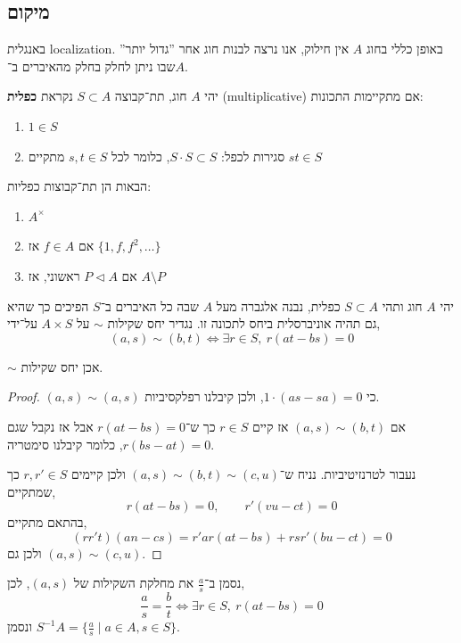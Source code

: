 \subsection{מיקום}
באנגלית localization.
באופן כללי בחוג $A$ אין חילוק, אנו נרצה לבנות חוג אחר ''גדול יותר'' שבו ניתן לחלק בחלק מהאיברים ב־$A$.
\begin{definition}
	יהי $A$ חוג, תת־קבוצה $S \subset A$ נקראת \textbf{כפלית} (multiplicative) אם מתקיימות התכונות:
	\begin{enumerate}
		\item $1 \in S$
		\item סגירות לכפל: $S \cdot S \subset S$, כלומר לכל $s, t \in S$ מתקיים $s t \in S$
	\end{enumerate}
\end{definition}
\begin{example}
	הבאות הן תת־קבוצות כפליות:
	\begin{enumerate}
		\item $A^\times$
		\item אם $f \in A$ אז $\{1, f, f^2, \ldots\}$
		\item אם $P \triangleleft A$ ראשוני, אז $A \setminus P$
	\end{enumerate}
\end{example}
יהי $A$ חוג ותהי $S \subset A$ כפלית, נבנה אלגברה מעל $A$ שבה כל האיברים ב־$S$ הפיכים כך שהיא גם תהיה אוניברסלית ביחס לתכונה זו.
נגדיר יחס שקילות $\sim$ על $A \times S$ על־ידי,
\[
	(a, s) \sim (b, t)
	\iff \exists r \in S,\ r(a t - b s) = 0
\]
\begin{proposition}
	$\sim$ אכן יחס שקילות.
\end{proposition}
\begin{proof}
	$(a, s) \sim (a, s)$ כי $1 \cdot (a s - s a) = 0$, ולכן קיבלנו רפלקסיביות.

	אם $(a, s) \sim (b, t)$ אז קיים $r \in S$ כך ש־$r (a t - b s) = 0$ אבל אז נקבל שגם $r (b s - a t) = 0$, כלומר קיבלנו סימטריה.

	נעבור לטרנזיטיביות.
	נניח ש־$(a, s) \sim (b, t) \sim (c, u)$ ולכן קיימים $r, r' \in S$ כך שמתקיים,
	\[
		r (a t - b s) = 0,
		\qquad
		r' (v u - c t) = 0
	\]
	בהתאם מתקיים,
	\[
		(r r' t) (a n - c s)
		= r' a r (a t - b s) + r s r' (b u - c t)
		= 0
	\]
	ולכן גם $(a, s) \sim (c, u)$.
\end{proof}
\begin{notation}
	נסמן ב־$\frac{a}{s}$ את מחלקת השקילות של $(a, s)$, לכן,
	\[
		\frac{a}{s} = \frac{b}{t}
		\iff \exists r \in S,\ r (a t - b s) = 0
	\]
	ונסמן $S^{-1} A = \{ \frac{a}{s} \mid a \in A, s \in S \}$.
\end{notation}
